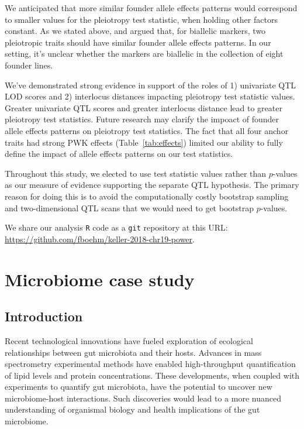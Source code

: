 \documentclass[oneside]{book}\usepackage[]{graphicx}\usepackage[]{color}
\begin{document}
We anticipated that more similar founder allele effects patterns would correspond to 
smaller values for the pleiotropy test statistic, when holding other factors constant.
As we stated above, \citet{macdonald2007joint} and \citet{king2012genetic} argued that,
for biallelic markers, two pleiotropic traits should have similar founder allele effects patterns. 
In our setting, it's unclear whether the markers are biallelic in the collection of eight founder lines.

We've demonstrated strong evidence in support of the roles of 1) univariate QTL LOD scores and
2) interlocus distances impacting pleiotropy test statistic values. 
Greater univariate QTL scores and greater interlocus distance lead to greater pleiotropy test statistics. 
Future research may clarify the impoact of founder allele effects patterns on pleiotropy test statistics. 
The fact that all four anchor traits had strong PWK effects (Table~\ref{tab:effects}) limited
our ability to fully define the impact of allele effects patterns on our test statistics.

Throughout this study, we elected to use test statistic values rather than $p$-values as 
our measure of evidence supporting the separate QTL hypothesis.
The primary reason for doing this is to avoid the computationally costly bootstrap
sampling and two-dimensional QTL scans that we would need to get bootstrap $p$-values.

We share our analysis \texttt{R} code \citep{r} as a \texttt{git}
repository at this URL: \url{https://github.com/fboehm/keller-2018-chr19-power}.




\section{Microbiome case study}
\subsection{Introduction}

Recent technological innovations have fueled exploration of ecological relationships between gut microbiota and their hosts. 
Advances in mass spectrometry experimental methods have enabled high-throughput quantification of lipid levels and protein concentrations. 
These developments, when coupled with experiments to quantify gut microbiota, have the potential to uncover new microbiome-host interactions. 
Such discoveries would lead to a more nuanced understanding of organismal biology and health implications of the gut microbiome. 
\end{document}
